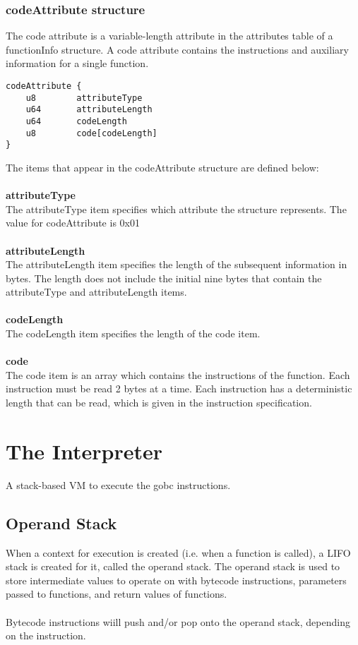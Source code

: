 \documentclass[12pt]{article}
\newcommand*{\formalfont}{\fontfamily{ptm}\selectfont}
\newcommand\tab[1][1cm]{\hspace*{#1}}
\begin{document}
			\subsubsection{codeAttribute structure}
			\label{sec:codeAttribute}
				The code attribute is a variable-length attribute in the attributes table of a functionInfo structure. A code attribute contains the instructions and auxiliary information for a single function.
			\begin{Verbatim}[frame=single]
codeAttribute {	
	u8        attributeType
	u64       attributeLength
	u64       codeLength
	u8        code[codeLength]
}
			\end{Verbatim}
			The items that appear in the {\formalfont codeAttribute} structure are defined below: \\ \\
			\textbf{attributeType} \\
				\tab The {\formalfont attributeType} item specifies which attribute the structure represents. The value for {\formalfont codeAttribute} is \colorbox{code}{0x01} \\ \\
			\textbf{attributeLength} \\
				\tab The {\formalfont attributeLength} item specifies the length of the subsequent information in bytes. The length does not include the initial nine bytes that contain the attributeType and attributeLength items. \\ \\
			\textbf{codeLength} \\
				\tab The {\formalfont codeLength} item specifies the length of the {\formalfont code} item. \\ \\
			\textbf{code} \\
				\tab The {\formalfont code} item is an array which contains the instructions of the function. Each instruction must be read 2 bytes at a time. Each instruction has a deterministic length that can be read, which is given in the instruction specification. 
						
	\newpage
	
	
	\section{The Interpreter}
		A stack-based VM to execute the {\formalfont gobc} instructions. 
		\subsection{Operand Stack}
			When a context for execution is created (i.e. when a function is called), a LIFO stack is created for it, called the operand stack. The operand stack is used to store intermediate values to operate on with bytecode instructions, parameters passed to functions, and return values of functions. \\ \\
			Bytecode instructions wiill push and/or pop onto the operand stack, depending on the instruction. 
\end{document}
